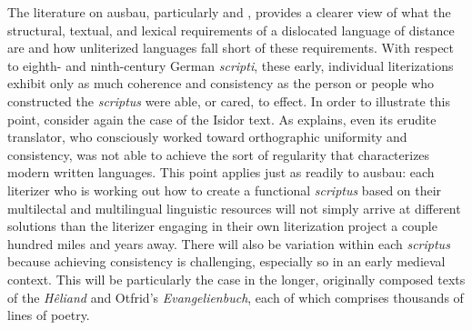 The literature on ausbau, particularly \citet{Kloss1967, Kloss1978} and \citet{KochOesterreicher1994}, provides a clearer view of what the structural, textual, and lexical requirements of a dislocated language of distance are and how unliterized languages fall short of these requirements. With respect to eighth- and ninth-century German \textit{scripti}, these early, individual literizations exhibit only as much coherence and consistency as the person or people who constructed the \textit{scriptus} were able, or cared, to effect. In order to illustrate this point, consider again the case of the Isidor text. As \citet[521--523]{Matzel1970} explains, even its erudite translator, who consciously worked toward orthographic uniformity and consistency, was not able to achieve the sort of regularity that characterizes modern written languages. This point applies just as readily to ausbau: each literizer who is working out how to create a functional \textit{scriptus} based on their multilectal and multilingual linguistic resources will not simply arrive at different solutions than the literizer engaging in their own literization project a couple hundred miles and years away. There will also be variation within each \textit{scriptus} because achieving consistency is challenging, especially so in an early medieval context. This will be particularly the case in the longer, originally composed texts of the \textit{Hêliand} and Otfrid’s \textit{Evangelienbuch}, each of which comprises thousands of lines of poetry.

